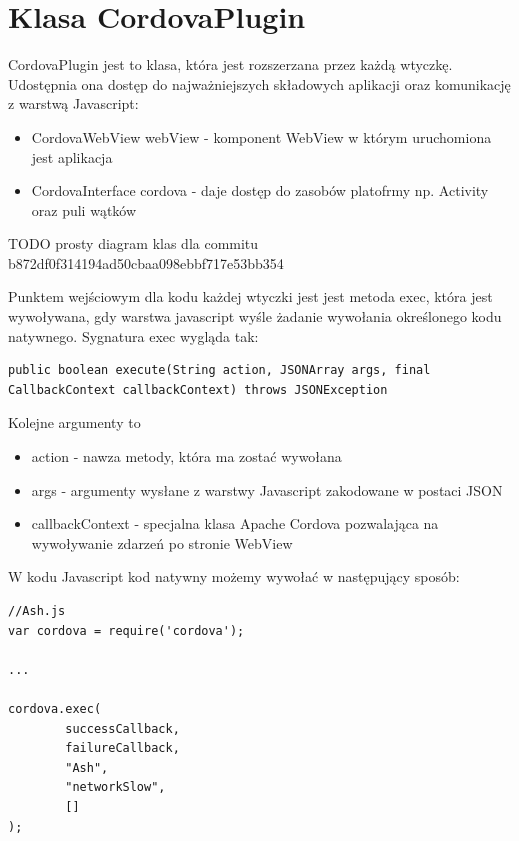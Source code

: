 \documentclass[brudnopis]{xmgr}
\begin{document}
\section{Klasa CordovaPlugin}

CordovaPlugin jest to klasa, która jest rozszerzana przez każdą wtyczkę. Udostępnia ona dostęp do najważniejszych składowych aplikacji oraz komunikację z warstwą Javascript: 

\begin{itemize}
  \item CordovaWebView webView - komponent WebView w którym uruchomiona jest aplikacja
  \item CordovaInterface cordova - daje dostęp do zasobów platofrmy np. Activity oraz puli wątków
\end{itemize}

{TODO prosty diagram klas dla commitu b872df0f314194ad50cbaa098ebbf717e53bb354}

Punktem wejściowym dla kodu każdej wtyczki jest jest metoda exec, która jest wywoływana, gdy warstwa javascript wyśle żadanie wywołania określonego kodu natywnego. Sygnatura exec wygląda tak:

\begin{lstlisting}
public boolean execute(String action, JSONArray args, final CallbackContext callbackContext) throws JSONException
\end{lstlisting}

Kolejne argumenty to
\begin{itemize}
  \item action - nawza metody, która ma zostać wywołana
  \item args - argumenty wysłane z warstwy Javascript zakodowane w postaci JSON
  \item callbackContext - specjalna klasa Apache Cordova pozwalająca na wywoływanie zdarzeń po stronie WebView 
\end{itemize}

W kodu Javascript kod natywny możemy wywołać w następujący sposób:

\begin{lstlisting}
//Ash.js
var cordova = require('cordova');

...

cordova.exec( 
        successCallback,
        failureCallback, 
        "Ash", 
        "networkSlow", 
        []
);
\end{lstlisting}
\end{document}
